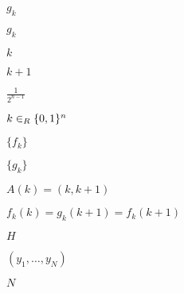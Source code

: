 \documentclass[10pt]{book}
\begin{document}
\begin{mdSnippets}
\begin{mdInlineSnippet}[19f4ab5a9238057877d5e89024b6d0ed]%
$g_k$\end{mdInlineSnippet}%
\begin{mdInlineSnippet}[19f4ab5a9238057877d5e89024b6d0ed]%
$g_k$\end{mdInlineSnippet}%
\begin{mdInlineSnippet}[8ce4b16b22b58894aa86c421e8759df3]%
$k$\end{mdInlineSnippet}%
\begin{mdInlineSnippet}[a31a860e7a59c7616c1515ec3ae652a6]%
$k+1$\end{mdInlineSnippet}%
\begin{mdInlineSnippet}[bb01c00e8b77357ff3732c4f3f3eb9bb]%
$\frac{1}{2^{n-1}}$\end{mdInlineSnippet}%
\begin{mdInlineSnippet}[78e23a6e415eb23446268dfdc3f94f6b]%
$k \in_R \{0,1\}^n$\end{mdInlineSnippet}%
\begin{mdInlineSnippet}%
$\{f_k\}$\end{mdInlineSnippet}%
\begin{mdInlineSnippet}[69608e0efa773cc5a9dd0021aa94d631]%
$\{g_k \}$\end{mdInlineSnippet}%
\begin{mdInlineSnippet}[efb9a282cb4fc80f883d099f48547467]%
$A(k) = (k, k+1)$\end{mdInlineSnippet}%
\begin{mdInlineSnippet}%
$f_k(k) = g_k(k+1) = f_k(k+1)$\end{mdInlineSnippet}%
\begin{mdInlineSnippet}[c1d9f50f86825a1a2302ec2449c17196]%
$H$\end{mdInlineSnippet}%
\begin{mdInlineSnippet}[dd636910f0860c3e2e8475741e9d306c]%
$(y_1,\ldots,y_N)$\end{mdInlineSnippet}%
\begin{mdInlineSnippet}[8d9c307cb7f3c4a32822a51922d1ceaa]%
$N$\end{mdInlineSnippet}%

\end{mdSnippets}
\end{document}
